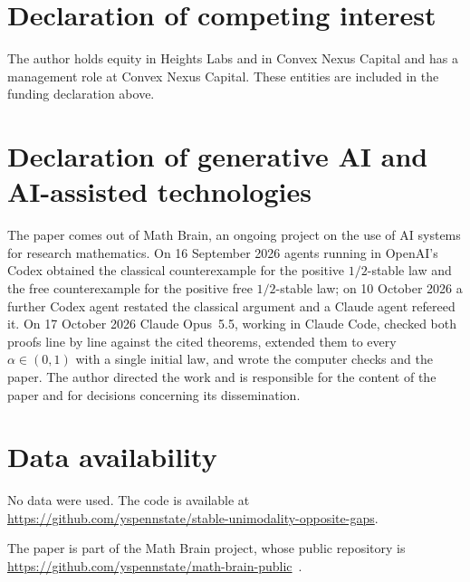 \documentclass[11pt]{amsart}
\theoremstyle{definition}
\theoremstyle{remark}
\numberwithin{equation}{section}
\begin{document}
\section*{Declaration of competing interest}
The author holds equity in Heights Labs and in Convex Nexus Capital and
has a management role at Convex Nexus Capital. These entities are included
in the funding declaration above.

\section*{Declaration of generative AI and AI-assisted technologies}
The paper comes out of Math Brain, an ongoing project on the use of AI systems for research mathematics. On 16 September 2026 agents running in OpenAI's Codex obtained the classical counterexample for the positive $1/2$-stable law and the free counterexample for the positive free $1/2$-stable law; on 10 October 2026 a further Codex agent restated the classical argument and a Claude agent refereed it. On 17 October 2026 Claude Opus~5.5, working in Claude Code, checked both proofs line by line against the cited theorems, extended them to every $\alpha\in(0,1)$ with a single initial law, and wrote the computer checks and the paper. The author directed the work and is responsible for the content of the paper and for decisions concerning its dissemination.

\section*{Data availability}
No data were used. The code is available at\\ \url{https://github.com/yspennstate/stable-unimodality-opposite-gaps}.

The paper is part of the Math Brain project, whose public repository is \url{https://github.com/yspennstate/math-brain-public}~\cite{MathBrainRepo}.
\end{document}
